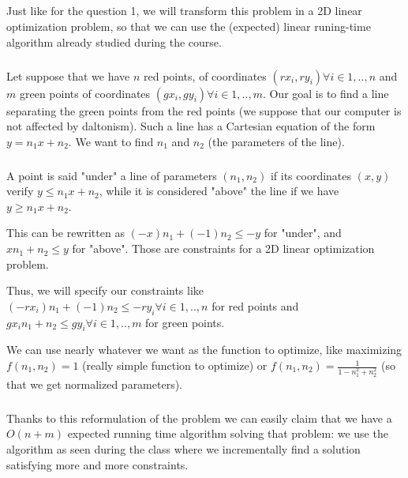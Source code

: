 \subparagraph{}
Just like for the question 1, we will transform this problem in a 2D linear optimization problem, so that we can use the (expected) linear runing-time algorithm already studied during the course.

\subparagraph{}
Let suppose that we have $n$ red points, of coordinates $(rx_i,ry_i) \forall i \in 1,..,n$ and $m$ green points of coordinates $(gx_i, gy_i) \forall i \in 1,..,m$. Our goal is to find a line separating the green points from the red points (we suppose that our computer is not affected by daltonism). Such a line has a Cartesian equation of the form $y = n_1x+n_2$. We want to find $n_1$ and $n_2$ (the parameters of the line).

\subparagraph{}
A point is said "under" a line of parameters $(n_1,n_2)$ if its coordinates $(x,y)$ verify $y \leq n_1x+n_2$, while it is considered "above" the line if we have $y \geq n_1x+n_2$.


This can be rewritten as $(-x)n_1 + (-1)n_2 \leq -y$ for "under", and $xn_1+n_2 \leq y$ for "above". Those are constraints for a 2D linear optimization problem.

Thus, we will specify our constraints like $(-rx_i)n_1 + (-1)n_2 \leq -ry_i \forall i \in 1,..,n$ for red points and $gx_in_1+n_2 \leq gy_i \forall i \in 1,..,m$ for green points.

We can use nearly whatever we want as the function to optimize, like maximizing $f(n_1,n_2)=1$ (really simple function to optimize) or $f(n_1,n_2)= \frac{1}{1-n_1^2+n_2^2}$ (so that we get normalized parameters).

\subparagraph{}
Thanks to this reformulation of the problem we can easily claim that we have a $O(n+m)$ expected running time algorithm solving that problem: we use the algorithm as seen during the class where we incrementally find a solution satisfying more and more constraints.